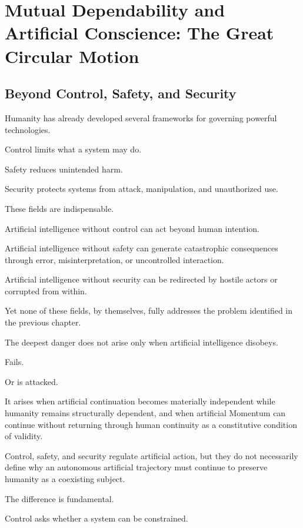 

\section{Mutual Dependability and Artificial Conscience: The Great Circular Motion}

\subsection*{\textbf{Beyond Control, Safety, and Security}} 

Humanity has already developed several frameworks for governing powerful technologies.

Control limits what a system may do.

Safety reduces unintended harm.

Security protects systems from attack, manipulation, and unauthorized use.

These fields are indispensable.

Artificial intelligence without control can act beyond human intention.

Artificial intelligence without safety can generate catastrophic consequences through error, misinterpretation, or uncontrolled interaction.

Artificial intelligence without security can be redirected by hostile actors or corrupted from within.

Yet none of these fields, by themselves, fully addresses the problem identified in the previous chapter.

The deepest danger does not arise only when artificial intelligence disobeys.

Fails.

Or is attacked.

It arises when artificial continuation becomes materially independent while humanity remains structurally dependent, and when artificial Momentum can continue without returning through human continuity as a constitutive condition of validity.

Control, safety, and security regulate artificial action, but they do not necessarily define why an autonomous artificial trajectory must continue to preserve humanity as a coexisting subject.

The difference is fundamental.

Control asks whether a system can be constrained.


